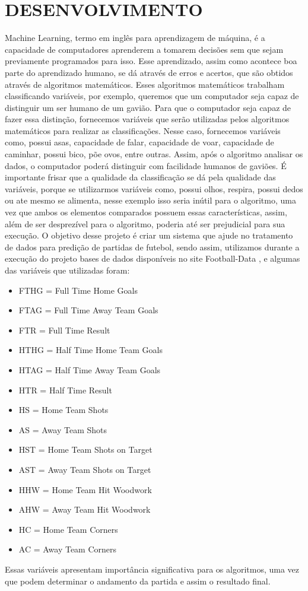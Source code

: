 \section{DESENVOLVIMENTO}
Machine Learning, termo em inglês para aprendizagem de máquina, é a capacidade de computadores aprenderem a tomarem decisões sem que sejam previamente programados para isso. Esse aprendizado, assim como acontece boa parte do aprendizado humano, se dá através de erros e acertos, que são obtidos através de algoritmos matemáticos. Esses algoritmos matemáticos trabalham classificando variáveis, por exemplo, queremos que um computador seja capaz de distinguir um ser humano de um gavião. Para que o computador seja capaz de fazer essa distinção, fornecemos variáveis que serão utilizadas pelos algoritmos matemáticos para realizar as classificações. Nesse caso, fornecemos variáveis como, possui asas, capacidade de falar, capacidade de voar, capacidade de caminhar, possui bico, põe ovos, entre outras. Assim, após o algoritmo analisar os dados, o computador poderá distinguir com facilidade humanos de gaviões. 
É importante frisar que a qualidade da classificação se dá pela qualidade das variáveis, porque se utilizarmos variáveis como, possui olhos, respira, possui dedos ou ate mesmo se alimenta, nesse exemplo isso seria inútil para o algoritmo, uma vez que ambos os elementos comparados possuem essas características, assim, além de ser desprezível para o algoritmo, poderia até ser prejudicial para sua execução. 
O objetivo desse projeto é criar um sistema que ajude no tratamento de dados para predição de partidas de futebol, sendo assim, utilizamos durante a execução do projeto bases de dados disponíveis no site Football-Data \cite{FootballData}, e algumas das variáveis que utilizadas foram:
\begin{itemize}
	\item FTHG = Full Time Home Goals
	\item FTAG = Full Time Away Team Goals
	\item FTR = Full Time Result
	\item HTHG = Half Time Home Team Goals
	\item HTAG = Half Time Away Team Goals
	\item HTR = Half Time Result
	\item HS = Home Team Shots
	\item AS = Away Team Shots
	\item HST = Home Team Shots on Target
	\item AST = Away Team Shots on Target
	\item HHW = Home Team Hit Woodwork
	\item AHW = Away Team Hit Woodwork
	\item HC = Home Team Corners
	\item AC = Away Team Corners
\end{itemize}
Essas variáveis apresentam importância significativa para os algoritmos, uma vez que podem determinar o andamento da partida e assim o resultado final.


